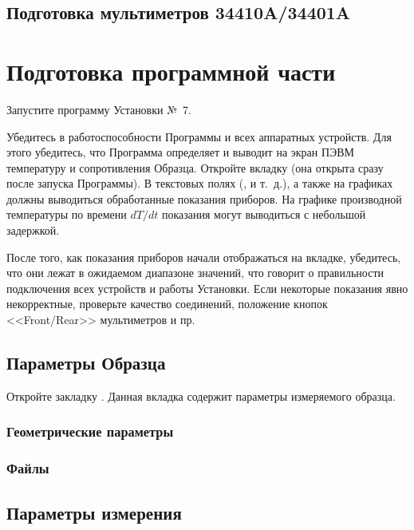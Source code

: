 \documentclass[12pt, a4paper, twocolumn]{report}
\begin{document}
\subsection{Подготовка мультиметров 34410A/34401A}



\section{Подготовка программной части}

Запустите программу Установки №~7.

Убедитесь в работоспособности Программы и всех аппаратных устройств. Для этого убедитесь, что Программа определяет и выводит на экран ПЭВМ температуру и сопротивления Образца. Откройте вкладку  (она открыта сразу после запуска Программы). В текстовых полях (,  и т.~д.), а также на графиках должны выводиться обработанные показания приборов. На графике производной температуры по времени $dT/dt$ показания могут выводиться с небольшой задержкой.

После того, как показания приборов начали отображаться на вкладке, убедитесь, что они лежат в ожидаемом диапазоне значений, что говорит о правильности подключения всех устройств и работы Установки. Если некоторые показания явно некорректные, проверьте качество соединений, положение кнопок <<Front/Rear>> мультиметров и пр.

\subsection{Параметры Образца}

Откройте закладку . Данная вкладка содержит параметры измеряемого образца.

\subsubsection{Геометрические параметры}
\label{sec_geom_params}



\subsubsection{Файлы}



\subsection{Параметры измерения}
\end{document}
